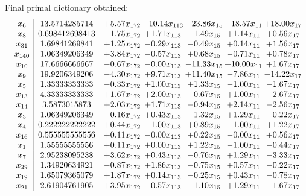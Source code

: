 \documentclass[8pt]{article}
\begin{document}
 Final primal dictionary obtained: 
\[\begin{array}{c| c c@{\hskip 2pt} c@{\hskip 2pt} c@{\hskip 2pt} c@{\hskip 2pt} c@{\hskip 2pt} }
 x_{6}   &  13.5714285714 & +  5.57 x_{172} & -10.14 x_{113} & -23.86 x_{15} & + 18.57 x_{11} & + 18.00 x_{17}\\
 x_{8}   &  0.698412698413 & -1.75 x_{172} & +  1.71 x_{113} & -1.49 x_{15} & +  1.14 x_{11} & +  0.56 x_{17}\\
 x_{31}   &  1.69841269841 & +  1.25 x_{172} & -0.29 x_{113} & -0.49 x_{15} & +  0.14 x_{11} & +  1.56 x_{17}\\
 x_{140}   &  1.06349206349 & +  3.84 x_{172} & -0.57 x_{113} & +  0.68 x_{15} & -0.71 x_{11} & +  0.78 x_{17}\\
 x_{10}   &  17.6666666667 & -0.67 x_{172} & -0.00 x_{113} & -11.33 x_{15} & + 10.00 x_{11} & +  1.67 x_{17}\\
 x_{9}   &  19.9206349206 & -4.30 x_{172} & +  9.71 x_{113} & + 11.40 x_{15} & -7.86 x_{11} & -14.22 x_{17}\\
 x_{5}   &  1.33333333333 & -0.33 x_{172} & +  1.00 x_{113} & +  1.33 x_{15} & -1.00 x_{11} & -1.67 x_{17}\\
 x_{13}   &  4.33333333333 & +  1.67 x_{172} & +  2.00 x_{113} & -0.67 x_{15} & +  1.00 x_{11} & -2.67 x_{17}\\
 x_{14}   &  3.5873015873 & +  2.03 x_{172} & +  1.71 x_{113} & -0.94 x_{15} & +  2.14 x_{11} & -2.56 x_{17}\\
 x_{3}   &  1.06349206349 & -0.16 x_{172} & +  0.43 x_{113} & -1.32 x_{15} & +  1.29 x_{11} & -0.22 x_{17}\\
 x_{4}   &  0.222222222222 & +  0.44 x_{172} & -1.00 x_{113} & +  0.89 x_{15} & -1.00 x_{11} & +  1.22 x_{17}\\
 x_{16}   &  0.555555555556 & +  0.11 x_{172} & -0.00 x_{113} & +  0.22 x_{15} & -0.00 x_{11} & +  0.56 x_{17}\\
 x_{1}   &  1.55555555556 & +  0.11 x_{172} & +  0.00 x_{113} & +  1.22 x_{15} & -1.00 x_{11} & -0.44 x_{17}\\
 x_{7}   &  2.95238095238 & +  3.62 x_{172} & +  0.43 x_{113} & -0.76 x_{15} & +  1.29 x_{11} & -3.33 x_{17}\\
 x_{29}   &  1.34920634921 & -0.87 x_{172} & +  1.86 x_{113} & -0.75 x_{15} & +  0.57 x_{11} & -0.22 x_{17}\\
 x_{19}   &  1.65079365079 & +  1.87 x_{172} & +  0.14 x_{113} & -0.25 x_{15} & +  0.43 x_{11} & -0.78 x_{17}\\
 x_{21}   &  2.61904761905 & +  3.95 x_{172} & -0.57 x_{113} & -1.10 x_{15} & +  1.29 x_{11} & -1.67 x_{17}\\

\end{array}\]
\end{document}
